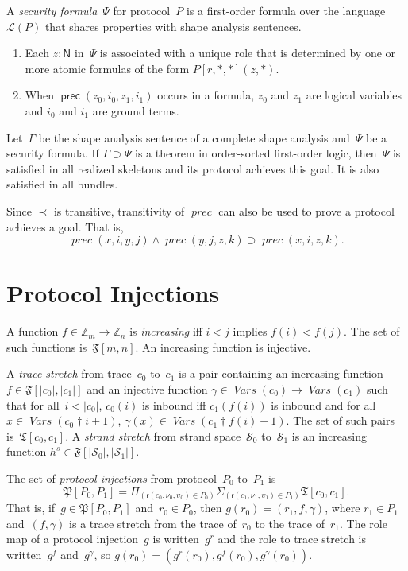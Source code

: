 \documentclass[12pt]{article}
\newcommand{\cn}[1]{\ensuremath{\operatorname{\mathsf{#1}}}}
\newcommand{\fn}[1]{\ensuremath{\operatorname{\mathit{#1}}}}
\newcommand{\srt}[1]{\ensuremath{\mathsf{#1}}}
\newcommand{\typ}{\mathbin:}
\newcommand{\vars}{\fn{Vars}}
\newcommand{\prefix}[2]{#1\dagger#2}
\newcommand{\zed}{\ensuremath{\mathbb{Z}}}
\newcommand{\dprod}[1]{\Pi_{(#1)}}
\newcommand{\dpair}[1]{\Sigma_{(#1)}}
\newcommand{\alg}[1]{\ensuremath{\mathfrak{#1}}}
\newcommand{\ssp}{\ensuremath{\mathcal{S}}}
\newcommand{\lang}{\mathcal{L}}
\newcommand{\role}{\mathsf{r}}
\begin{document}
A \emph{security formula}~$\Psi$ for protocol~$P$ is a first-order
formula over the language~$\lang(P)$ that shares properties with shape
analysis sentences.
\begin{enumerate}
\item Each $z\typ\srt{N}$ in~$\Psi$ is associated with a unique role
  that is determined by one or more atomic formulas of the form
  $P[r,\ast,\ast](z,\ast)$.
\item When $\cn{prec}(z_0,i_0,z_1,i_1)$ occurs in a formula, $z_0$ and
  $z_1$ are logical variables and $i_0$ and $i_1$ are ground terms.
\end{enumerate}

Let~$\Gamma$ be the shape analysis sentence of a complete shape
analysis and~$\Psi$ be a security formula.  If $\Gamma\supset\Psi$ is a
theorem in order-sorted first-order logic, then~$\Psi$ is satisfied in
all realized skeletons and its protocol achieves this goal.  It is
also satisfied in all bundles.

Since $\prec$ is transitive, transitivity of \fn{prec} can also be
used to prove a protocol achieves a goal.  That is,
\[\fn{prec}(x,i,y,j)
\land\fn{prec}(y,j,z,k)\supset
\fn{prec}(x,i,z,k).\]

\section{Protocol Injections}\label{sec:protocol injections}

A function $f\in\zed_m\to\zed_n$ is \emph{increasing} iff $i<j$
implies $f(i)<f(j)$.  The set of such functions is~$\alg{F}[m,n]$.  An
increasing function is injective.

A \emph{trace stretch} from trace~$c_0$ to~$c_1$ is a pair containing
an increasing function $f\in\alg{F}[|c_0|, |c_1|]$ and an injective
function $\gamma\in\vars(c_0)\to\vars(c_1)$ such that for
all~$i<|c_0|$, $c_0(i)$ is inbound iff $c_1(f(i))$ is inbound and for
all $x\in\vars(\prefix{c_0}{i+1})$,
$\gamma(x)\in\vars(\prefix{c_1}{f(i)+1})$.  The set of such pairs
is~$\alg{T}[c_0,c_1]$.  A \emph{strand stretch} from strand
space~$\ssp_0$ to~$\ssp_1$ is an increasing function
$h^s\in\alg{F}[|\ssp_0|, |\ssp_1|]$.

The set of \emph{protocol injections} from protocol~$P_0$ to~$P_1$ is
\[\alg{P}[P_0,P_1]=\dprod{\role(c_0,\nu_0,\upsilon_0)\in
  P_0}\dpair{\role(c_1,\nu_1,\upsilon_1)\in P_1}\alg{T}[c_0,c_1].\]
That is, if~$g\in\alg{P}[P_0,P_1]$ and~$r_0\in P_0$, then
$g(r_0)=(r_1,f,\gamma)$, where $r_1\in P_1$ and~$(f,\gamma)$ is a
trace stretch from the trace of~$r_0$ to the trace of~$r_1$.  The role
map of a protocol injection~$g$ is written~$g^r$ and the role to trace
stretch is written~$g^f$ and~$g^\gamma$, so $g(r_0)=(g^r(r_0),
g^f(r_0),g^\gamma(r_0))$.
\end{document}
